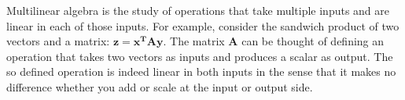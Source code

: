 Multilinear algebra is the study of operations that take multiple inputs and are linear in each of those inputs. For example, consider the sandwich product of two vectors and a matrix: $\mathbf{z = x^T A y}$. The matrix $\mathbf{A}$ can be thought of defining an operation that takes two vectors as inputs and produces a scalar as output. The so defined operation is indeed linear in both inputs in the sense that it makes no difference whether you add or scale at the input or output side.